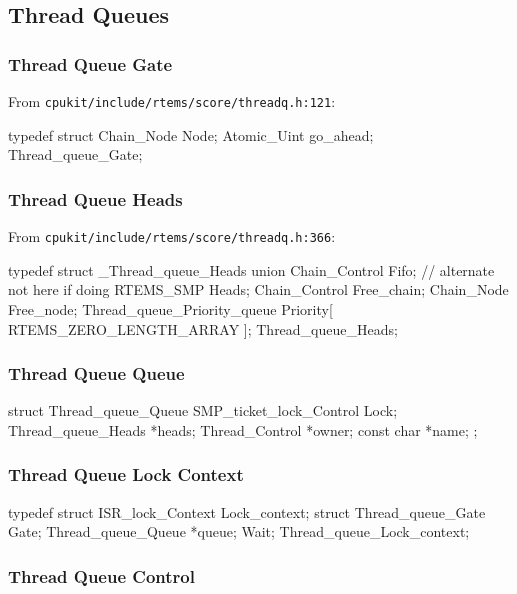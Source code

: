 \newpage
\subsection{Thread Queues}

\subsubsection{Thread Queue Gate}

From \texttt{cpukit/include/rtems/score/threadq.h:121}:
\begin{nicec}
typedef struct {
  Chain_Node Node;
  Atomic_Uint go_ahead;
} Thread_queue_Gate;
\end{nicec}

\subsubsection{Thread Queue Heads}

From \texttt{cpukit/include/rtems/score/threadq.h:366}:
\begin{nicec}
typedef struct _Thread_queue_Heads {
  union {
    Chain_Control Fifo;
    // alternate not here if doing RTEMS_SMP
  } Heads;
  Chain_Control Free_chain;
  Chain_Node Free_node;
  Thread_queue_Priority_queue Priority[ RTEMS_ZERO_LENGTH_ARRAY ];
} Thread_queue_Heads;
\end{nicec}


\subsubsection{Thread Queue Queue}

\begin{nicec}
struct Thread_queue_Queue {
  SMP_ticket_lock_Control Lock;
  Thread_queue_Heads *heads;
  Thread_Control *owner;
  const char *name;
};
\end{nicec}

\subsubsection{Thread Queue Lock Context}

\begin{nicec}
typedef struct {
  ISR_lock_Context Lock_context;
  struct {
    Thread_queue_Gate Gate;
    Thread_queue_Queue *queue;
  } Wait;
} Thread_queue_Lock_context;
\end{nicec}

\subsubsection{Thread Queue Control}


